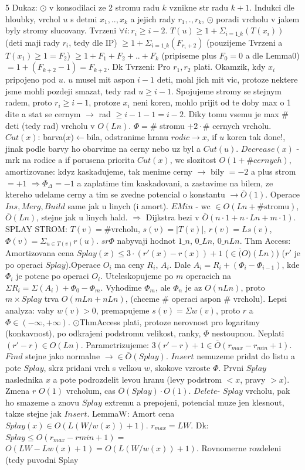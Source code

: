 \documentclass[8pt]{extarticle}
\begin{document}
\begin{multicols*}{5}
Dukaz: $\odot$ v konsodilaci ze 2 stromu radu $k$ vznikne str radu $k+1$. Indukci dle hloubky, vrchol $u$ s detmi $x_1,..,x_k$ a jejich rady $r_1,.,r_k$, $\odot$ poradi vrcholu v jakem byly stromy slucovany. Tvrzeni $\forall i: r_i \geq i-2$. $T(u) \geq 1 + \Sigma_{i=1\_k}(T(x_i))$ (deti maji rady $r_i$, tedy dle IP) $\geq 1 + \Sigma_{i=1\_k}(F_{r_i+2})$ (pouzijeme Tvrzeni a $T(x_1) \geq 1 = F_2$) $\geq 1 + F_1 + F_2 + .. + F_k$ (pripiseme plus $ F_0 = 0$ a dle Lemma0) $=1 + (F_{k+2} -1) = F_{k+2}$. Dk Tvrzeni: Pro $r_1, r_2$ plati. Okamzik, kdy $x_i$ pripojeno pod $u$. $u$ musel mit aspon $i-1$ deti, mohl jich mit vic, protoze nektere jsme mohli pozdeji smazat, tedy rad $u \geq i-1$. Spojujeme stromy se stejnym radem, proto $r_i \geq i-1$, protoze $x_i$ neni koren, mohlo prijit od te doby max o 1 dite a stat se cernym $\rightarrow$ rad $\geq i-1-1 = i-2$. Diky tomu vsemu je max \# deti (tedy rad) vrcholu v $O(Ln)$. $\Phi = \#$ stromu $+ 2\cdot\#$ cernych vrcholu. $Cut(x)$: barva($x$)$\leftarrow$bila, odstranime hranu $rodic\rightarrow x$, if $u$ koren tak done!, jinak podle barvy ho obarvime na cerny nebo uz byl a $Cut(u)$. $Decrease(x)$ - mrk na rodice a if porusena priorita $Cut(x)$, wc slozitost $O(1 + \#cernych)$, amortizovane: kdyz kaskadujeme, tak menime cerny $\rightarrow$ bily $=-2$ a plus strom $=+1$ $\Rightarrow \Phi_\Delta = -1$ a zaplatime tim kaskadovani, a zastavime na bilem, ze ktereho udelame cerny a tim se zvedne potencial o konstantu $\rightarrow \overline{O}(1)$. Operace $Ins, Merg, Build$ same jak u linych (i amort). $EMin$ - wc $\in O(Ln + \#\text{stromu})$, $\overline{O}(Ln)$, stejne jak u linych hald. $\Rightarrow$ Dijkstra bezi v $\overline{O}(n\cdot 1 + n\cdot Ln +m\cdot1)$. SPLAY STROM: $T(v)=\#\text{vrcholu}$, $s(v)=|T(v)|$, $r(v)=Ls(v)$, $\Phi(v)=\Sigma_{u\in T(v)} r(u)$. $sr\Phi$ nabyvaji hodnot $1\_n$, $0\_Ln$, $0\_nLn$. Thm Access: Amortizovana cena $Splay(x) \leq 3\cdot(r'(x)-r(x)) +1$ ($\in \overline(O)(Ln)$) ($r'$ je po operaci $Splay$).Operace $O_i$ ma ceny $R_i$, $A_i$. Dale $A_i = R_i + (\Phi_i -\Phi_{i-1})$, kde $\Phi_i$ je potenc po operaci $O_i$. Uteleskopujeme po $m$ operacich na $\Sigma R_i = \Sigma(A_i) + \Phi_0 - \Phi_m$. Vyhodime $\Phi_m$, ale $\Phi_n$ je az $O(nLn)$, proto $m \times Splay$ trva $O(mLn + nLn)$, (chceme \# operaci aspon \# vrcholu). Lepsi analyza: vahy $w(v)>0$, premapujeme $s(v)=\Sigma w(v)$, proto $r$ a $\Phi \in (-\infty, +\infty)$. $\odot$ThmAccess plati, protoze nerovnost pro logaritmy (konkavnost), po odkrajeni podstromu velikost, ranky, $\Phi$ nestoupnou. Neplati $(r'-r) \in O(Ln)$. Parametrizujeme: $3(r'-r)+1 \in \overline{O}(r_{max} - r_{min} + 1)$. $Find$ stejne jako normalne $\rightarrow\in\overline{O}(Splay)$. $Insert$ nemuzeme pridat do listu a pote $Splay$, skrz pridani vrch s velkou $w$, skokove vzroste $\Phi$. Prvni $Splay$ naslednika $x$ a pote podrozdelit levou hranu (levy podstrom $<x$, pravy $>x$). Zmena $r$ $O(1)$ vrcholum, cas $\overline{O}(Splay)\cdot O(1)$. $Delete$- $Splay$ vrcholu, pak ho smazeme a znovu $Splay$ extremu a prepojeni, potencial muze jen klesnout, takze stejne jak $Insert$. LemmaW: Amort cena $Splay(x) \in O(L(W/w(x))+1)$. $r_{max} = LW$. Dk: $Splay \leq O(r_{max}-r{min}+1) =$ $O(LW - Lw(x) +1) = O(L(W/w(x))+1)$. Rovnomerne rozdeleni (tedy puvodni Splay 
\end{multicols*}
\end{document}
